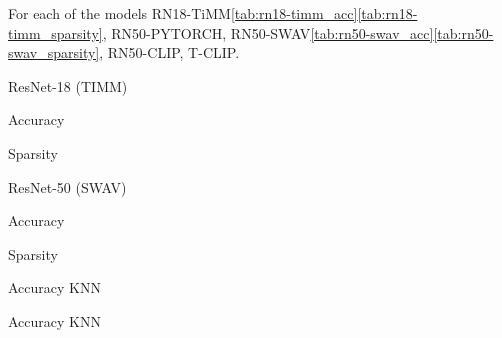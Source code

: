 \documentclass{article}
\begin{document}
    For each of the models RN18-TiMM\ref{tab:rn18-timm_acc}\ref{tab:rn18-timm_sparsity},
    RN50-PYTORCH,
    RN50-SWAV\ref{tab:rn50-swav_acc}\ref{tab:rn50-swav_sparsity},
    RN50-CLIP,
    T-CLIP.

    \begin{table}[h]
        \captionsetup{aboveskip=5pt,belowskip=5pt}
        \caption{ResNet-18 (TIMM)}

        \begin{subtable}{.60\linewidth}
            \centering
            \caption{Accuracy}\label{tab:rn18-timm_acc}
        \end{subtable}
        \hfill
        \begin{subtable}{.30\linewidth}
            \centering
            \caption{Sparsity}\label{tab:rn18-timm_sparsity}
        \end{subtable}
    \end{table}

    \begin{table}[h]
        \captionsetup{aboveskip=5pt,belowskip=5pt}
        \caption{ResNet-50 (SWAV)}

        \begin{subtable}{.30\linewidth}
            \centering
            \caption{Accuracy}\label{tab:rn50-swav_acc}
        \end{subtable}
        \hfill
        \begin{subtable}{.30\linewidth}
            \centering
            \caption{Sparsity}\label{tab:rn50-swav_sparsity}
        \end{subtable}
    \end{table}

    \begin{table}[h]
        \caption{Accuracy KNN}
    \end{table}


    \begin{table}[h]
        \caption{Accuracy KNN}
    \end{table}
\end{document}
